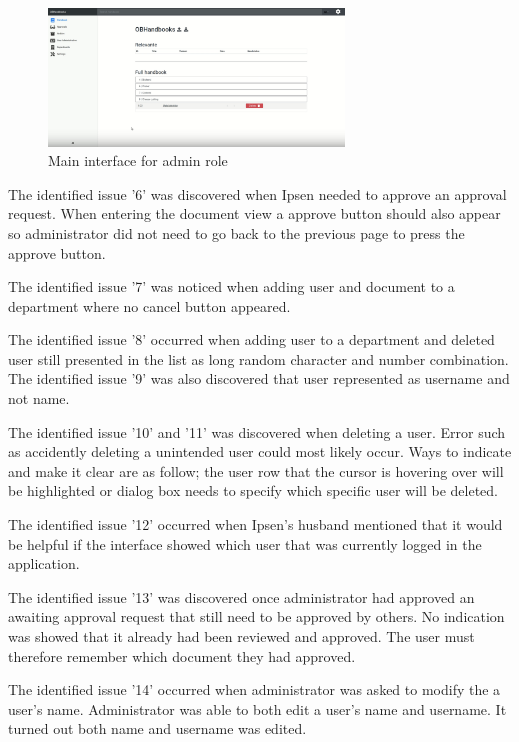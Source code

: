\begin{figure}[H]
	\centering
		\includegraphics[width=0.7\textwidth]{billeder/MainInterfaceAdmin.png}
	\caption{Main interface for admin role}\label{fig:MainInterfaceAdmin}
\end{figure}

The identified issue '6' was discovered when Ipsen needed to approve an approval request.  
When entering the document view a approve button should also appear so administrator did not need to go back to the previous page to press the approve button. 

The identified issue '7' was noticed when adding user and document to a department where no cancel button appeared. 

The identified issue '8' occurred when adding user to a department and deleted user still presented in the list as long random character and number combination. The identified issue '9' was also discovered that user represented as username and not name. 

The identified issue '10'  and '11' was discovered when deleting a user.
Error such as accidently deleting a unintended user could most likely occur.  
Ways to indicate and make it clear are as follow; the user row that the cursor is hovering over will be highlighted or dialog box needs to specify which specific user will be deleted.  

The identified issue '12' occurred when Ipsen's husband mentioned that it would be helpful if the interface showed which user that was currently logged in the application. 

The identified issue '13' was discovered once administrator had approved an awaiting approval request that still need to be approved by others. 
No indication was showed that it already had been reviewed and approved.
The user must therefore remember which document they had approved. 

The identified issue '14' occurred when administrator was asked to modify the a user's name. 
Administrator was able to both edit a user's name and username. 
It turned out both name and username was edited. 

